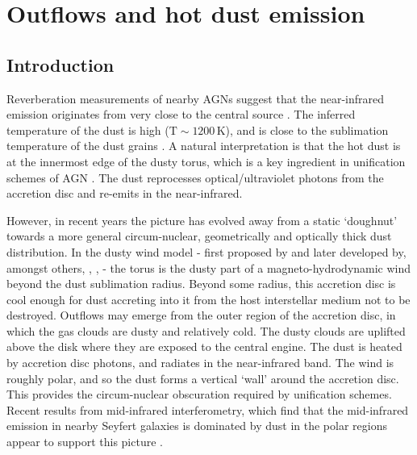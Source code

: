 
\chapter{Outflows and hot dust emission}
\label{ch:sed} 



\section{Introduction}

Reverberation measurements of nearby AGNs suggest that the near-infrared emission originates from very close to the central source \citep[few tens of light days; e.g.][]{minezaki04,suganuma06}. 
The inferred temperature of the dust is high (${\mathrm T}\sim1200$\,K), and is close to the sublimation temperature of the dust grains \citep[e.g.][]{barvainis92}.
A natural interpretation is that the hot dust is at the innermost edge of the dusty torus, which is a key ingredient in unification schemes of AGN \citep{antonucci93,urry95}. 
The dust reprocesses optical/ultraviolet photons from the accretion disc and re-emits in the near-infrared. 

However, in recent years the picture has evolved away from a static `doughnut' towards a more general circum-nuclear, geometrically and optically thick dust distribution. 
In the dusty wind model - first proposed by \citet{konigl94} and later developed by, amongst others, \citet{everett05}, \citet{elitzur06}, \citet{keating12} - the torus is the dusty part of a magneto-hydrodynamic wind beyond the dust sublimation radius. 
Beyond some radius, this accretion disc is cool enough for dust accreting into it from the host interstellar medium not to be destroyed. 
Outflows may emerge from the outer region of the accretion disc, in which the gas clouds are dusty and relatively cold.
The dusty clouds are uplifted above the disk where they are exposed to the central engine. 
The dust is heated by accretion disc photons, and radiates in the near-infrared band.
The wind is roughly polar, and so the dust forms a vertical `wall' around the accretion disc.  
This provides the circum-nuclear obscuration required by unification schemes. 
Recent results from mid-infrared interferometry, which find that the mid-infrared emission in nearby Seyfert galaxies is dominated by dust in the polar regions appear to support this picture \citep[e.g.][]{honig13}.  

